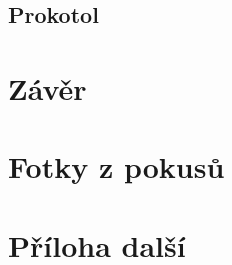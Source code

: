 \documentclass[12pt]{report}			%
\begin{document}
\section{Prokotol}

\lipsum[1]	



	\chapter*{Závěr}
	
		\lipsum[1]
	
	\nocite{*}
    	\printbibliography					
    \printglossary[title={Zkratky}]		
    \listoffigures					
    \listoftables						

    \begin{appendices}
	\chapter{Fotky z pokusů}	
	\lipsum[1]
	\chapter{Příloha další }
	\end{appendices}
\end{document}
